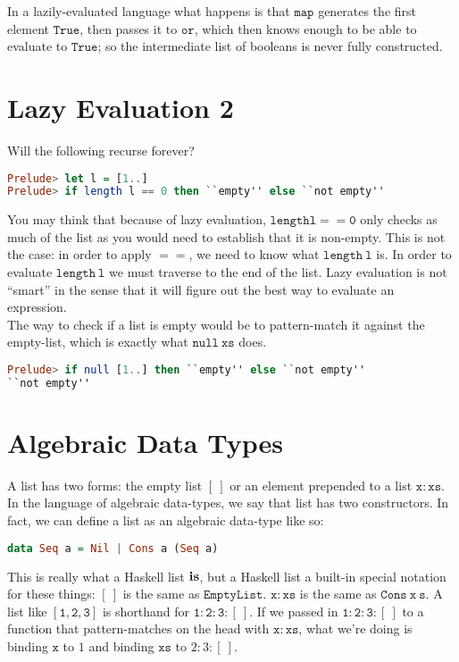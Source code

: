 \documentclass[a4paper,12pt]{article}
\newcommand{\kwa}[1]{\mathtt{#1}}
\begin{document}
\noindent
In a lazily-evaluated language what happens is that $\kwa{map}$ generates the first element $\kwa{True}$, then passes it to $\kwa{or}$, which then knows enough to be able to evaluate to $\kwa{True}$; so the intermediate list of booleans is never fully constructed.\\

\section{Lazy Evaluation 2}

\noindent
Will the following recurse forever?
\begin{lstlisting}[language=Haskell]
Prelude> let l = [1..]
Prelude> if length l == 0 then ``empty'' else ``not empty''
\end{lstlisting}

\noindent
You may think that because of lazy evaluation, $\kwa{length l == 0}$ only checks as much of the list as you would need to establish that it is non-empty. This is not the case: in order to apply $\kwa{==}$, we need to know what $\kwa{length~l}$ is. In order to evaluate $\kwa{length~l}$ we must traverse to the end of the list. Lazy evaluation is not ``smart'' in the sense that it will figure out the best way to evaluate an expression. \\

\noindent
The way to check if a list is empty would be to pattern-match it against the empty-list, which is exactly what $\kwa{null~xs}$ does.

\begin{lstlisting}[language=Haskell]
Prelude> if null [1..] then ``empty'' else ``not empty''
``not empty''
\end{lstlisting}

\section{Algebraic Data Types}

\noindent
A list has two forms: the empty list $\kwa{[~]}$ or an element prepended to a list $\kwa{x:xs}$. In the language of algebraic data-types, we say that list has two constructors. In fact, we can define a list as an algebraic data-type like so:

\begin{lstlisting}[language=Haskell]
data Seq a = Nil | Cons a (Seq a)
\end{lstlisting}

\noindent
This is really what a Haskell list $\bf{is}$, but a Haskell list a built-in special notation for these things: $[~]$ is the same as $\kwa{EmptyList}$. $\kwa{x:xs}$ is the same as $\kwa{Cons~x~s}$. A list like $\kwa{[1,2,3]}$ is shorthand for $\kwa{1:2:3:[~]}$. If we passed in $\kwa{1:2:3:[~]}$ to a function that pattern-matches on the head with $\kwa{x:xs}$, what we're doing is binding $\kwa{x}$ to $1$ and binding $\kwa{xs}$ to $2:3:[~]$. \\
\end{document}
